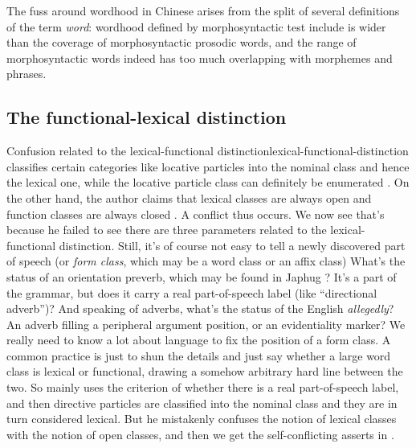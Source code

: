 \documentclass[UTF8, a4paper, oneside, scheme=plain, 12pt]{ctexrep}
\newcommand*{\citesec}[1]{\S~{#1}}
\newcommand*{\term}[1]{\emph{#1}}
\newcommand{\form}[1]{\emph{#1}}
\begin{document}
The fuss around wordhood in Chinese 
arises from the split of several definitions of the term \term{word}:
wordhood defined by morphosyntactic test include is wider 
than the coverage of morphosyntactic prosodic words,
and the range of morphosyntactic words indeed 
has too much overlapping with morphemes and phrases.

\subsection{The functional-lexical distinction}

\begin{infobox}{Confusion related to the lexical-functional distinction}{lexical-functional-distinction}
    \citep[\citesec{3.6}]{zhudexigrammar} classifies 
    certain categories like locative particles %
    into the nominal class and hence the lexical one,
    while the locative particle class can definitely be enumerated \citep[\citesec{4.4}]{zhudexigrammar}.
    On the other hand, 
    the author claims that lexical classes are always open 
    and function classes are always closed \citet[\citesec{3.4}]{zhudexigrammar}.
    A conflict thus occurs.
    We now see that's because he failed to see there are three parameters 
    related to the lexical-functional distinction.  
    Still, it's of course not easy to tell a newly discovered part of speech 
    (or \term{form class}, which may be a word class or an affix class)
    What's the status of an orientation preverb, 
    which may be found in Japhug \citep{jacques2021grammar}?
    It's a part of the grammar,
    but does it carry a real part-of-speech label (like ``directional adverb'')?
    And speaking of adverbs, what's the status of the English \form{allegedly}?
    An adverb filling a peripheral argument position,
    or an evidentiality marker?
    We really need to know a lot about language to fix the position of a form class.
    A common practice is just to shun the details and just say 
    whether a large word class is lexical or functional,
    drawing a somehow arbitrary hard line between the two.
    So \citet{zhudexigrammar} mainly uses the criterion of whether there is a real part-of-speech label,
    and then directive particles are classified into the nominal class 
    and they are in turn considered lexical.
    But he mistakenly confuses the notion of lexical classes with the notion of open classes,
    and then we get the self-conflicting asserts in \citet[\citesec{3.4}]{zhudexigrammar}.
\end{infobox}
\end{document}
